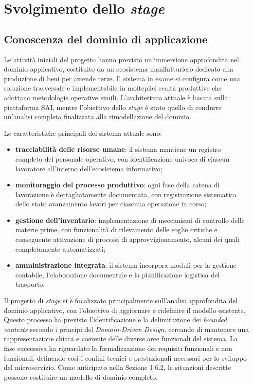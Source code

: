 \chapter{Svolgimento dello \textit{stage}}
    \section{Conoscenza del dominio di applicazione}
    Le attività iniziali del progetto hanno previsto un'immersione approfondita nel dominio applicativo, costituito da un ecosistema manifatturiero dedicato alla produzione di beni per aziende terze. Il sistema in esame si configura come una soluzione trasversale e implementabile in molteplici realtà produttive che adottano metodologie operative simili. L'architettura attuale è basata sulla piattaforma SAI, mentre l'obiettivo dello \textit{stage} è stato quello di condurre un'analisi completa finalizzata alla rimodellazione del dominio.

    \vspace{0.2 em}
    \noindent Le caratteristiche principali del sistema attuale sono:

    \begin{itemize}
        \item \textbf{tracciabilità delle risorse umane}: il sistema mantiene un registro completo del personale operativo, con identificazione univoca di ciascun lavoratore all'interno dell'ecosistema informativo;

        \item \textbf{monitoraggio del processo produttivo}: ogni fase della catena di lavorazione è dettagliatamente documentata, con registrazione sistematica dello stato avanzamento lavori per ciascuna operazione in corso;

        \item \textbf{gestione dell'inventario}: implementazione di meccanismi di controllo delle materie prime, con funzionalità di rilevamento delle soglie critiche e conseguente attivazione di processi di approvvigionamento, alcuni dei quali completamente automatizzati;

        \item \textbf{amministrazione integrata}: il sistema incorpora moduli per la gestione contabile, l'elaborazione documentale e la pianificazione logistica del trasporto.

    \end{itemize}
    
    \vspace{0.2 em}
    \noindent Il progetto di \textit{stage} si è focalizzato principalmente sull'analisi approfondita del dominio applicativo, con l'obiettivo di aggiornare e ridefinire il modello esistente. Questo processo ha previsto l'identificazione e la delimitazione dei \textit{bounded contexts} secondo i principi del \textit{Domain-Driven Design}, cercando di mantenere una rappresentazione chiara e coerente delle diverse aree funzionali del sistema. La fase successiva ha riguardato la formalizzazione dei requisiti funzionali e non funzionali, definendo così i confini tecnici e prestazionali necessari per lo sviluppo del microservizio. Come anticipato nella Sezione 1.6.2, le situazioni descritte possono costituire un modello di dominio completo.  

